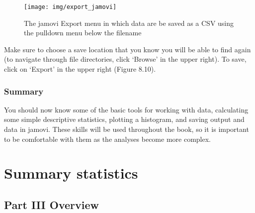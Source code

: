\documentclass[
]{scrbook}
\begin{document}
\begin{figure}
\texttt{[image: img/export\_jamovi]} \caption{The jamovi Export menu in which data are be saved as a CSV using the pulldown menu below the filename}\label{fig:unnamed-chunk-33}
\end{figure}

Make sure to choose a save location that you know you will be able to find again (to navigate through file directories, click `Browse' in the upper right).
To save, click on `Export' in the upper right (Figure 8.10).

\hypertarget{summary-1}{%
\section{Summary}\label{summary-1}}

You should now know some of the basic tools for working with data, calculating some simple descriptive statistics, plotting a histogram, and saving output and data in jamovi.
These skills will be used throughout the book, so it is important to be comfortable with them as the analyses become more complex.

\hypertarget{part-summary-statistics}{%
\part{Summary statistics}\label{part-summary-statistics}}

\hypertarget{Week3}{%
\chapter*{Part III Overview}\label{Week3}}
\end{document}
